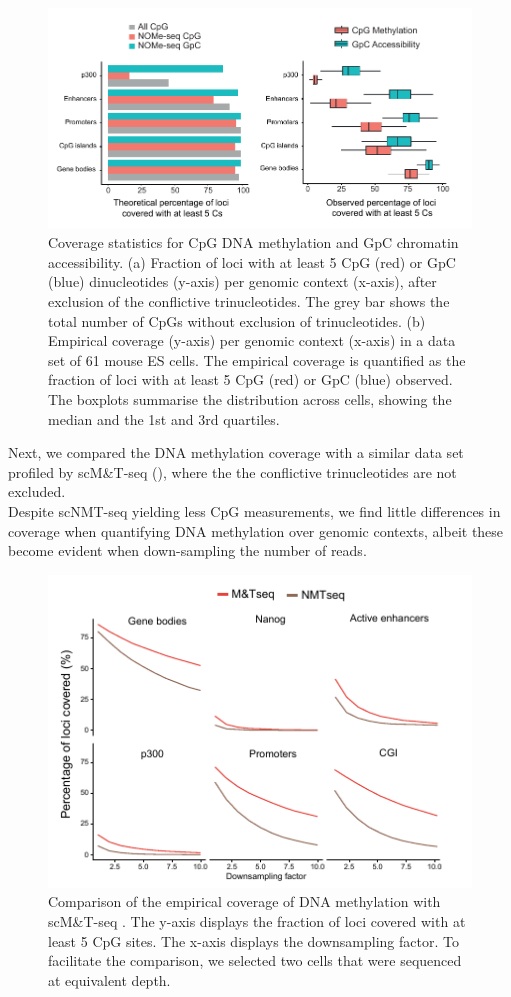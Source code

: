 \begin{figure}[H]
	\centering
	\includegraphics[width=1.0\linewidth]{scNMT_coverage}
	\caption[]{Coverage statistics for CpG DNA methylation and GpC chromatin accessibility. (a) Fraction of loci with at least 5 CpG (red) or GpC (blue) dinucleotides (y-axis) per genomic context (x-axis), after exclusion of the conflictive trinucleotides. The grey bar shows the total number of CpGs without exclusion of trinucleotides. (b) Empirical coverage (y-axis) per genomic context (x-axis) in a data set of 61 mouse ES cells. The empirical coverage is quantified as the fraction of loci with at least 5 CpG (red) or GpC (blue) observed. The boxplots summarise the distribution across cells, showing the median and the 1st and 3rd quartiles.}
	\label{fig:scnmt_coverage}
\end{figure}

Next, we compared the DNA methylation coverage with a similar data set profiled by scM\&T-seq \cite{Angermueller2016} (), where the the conflictive trinucleotides are not excluded.\\
Despite scNMT-seq yielding less CpG measurements, we find little differences in coverage when quantifying DNA methylation over genomic contexts, albeit these become evident when down-sampling the number of reads.

\begin{figure}[H]
	\centering
	\includegraphics[width=0.8\linewidth]{scNMT_coverage2}
	\caption[]{Comparison of the empirical coverage of DNA methylation with scM\&T-seq \cite{Angermueller2016}.
	The y-axis displays the fraction of loci covered with at least 5 CpG sites. The x-axis displays the downsampling factor. To facilitate the comparison, we selected two cells that were sequenced at equivalent depth.}
	\label{fig:scnmt_coverage2}
\end{figure}

